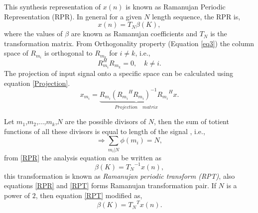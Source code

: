 \documentclass[conference]{IEEEtran}
\newcommand{\RNum}[1]{\uppercase\expandafter{\romannumeral #1\relax}}
\begin{document}
This synthesis representation of $x(n)$ is known as Ramanujan Periodic Representation (RPR). In general for a given $N$ length sequence, the RPR is,
\begin{equation}
\label{RPR}
x(n) = {T_N}\beta(K),
\end{equation}
where the values of $\beta$ are known as Ramanujan coefficients and $T_N$ is the transformation matrix. From Orthogonality property (Equation  \eqref{eq3}) the column space of $R_{m_i}$ is orthogonal to $R_{m_k}$ for $i{\neq}k$, i.e.,
\begin{equation}
\label{orthogonal}
{R_{m_i}^H}{R_{m_k}} = 0,{\quad} k{\neq}i.
\end{equation}
The projection of input signal onto a specific space can be calculated using equation \eqref{Projection}.
\begin{equation}
\label{Projection}
x_{m_{i}} = \underbrace{R_{m_{i}}({R_{m_{i}}}^{H}R_{m_{i}})^{-1}{R_{m_{i}}}^{H}}_{{Projection}{\quad}{matrix}}x.
\end{equation}

Let $m_1$,$m_2$,$...$,$m_k$,$N$ are the possible divisors of $N$, then the sum of totient functions of all these divisors is equal to length of the signal \cite{6839030}, i.e.,
\begin{equation}
\Rightarrow \sum_{{m_i}|N}\phi(m_i) = N,
\end{equation}
from \eqref{RPR} the analysis equation can be written as
\begin{equation}
\label{RPT}
\beta(K) = {T_N}^{-1}x(n),
\end{equation}
this transformation is known as \textit{Ramanujan periodic transform (RPT)}, also equations \eqref{RPR} and \eqref{RPT} forms Ramanujan transformation pair. If $N$ is a power of $2$, then equation  \eqref{RPT} modified as,
\begin{equation}
\beta(K) = {T_N}^{T}x(n).
\end{equation}
\end{document}
